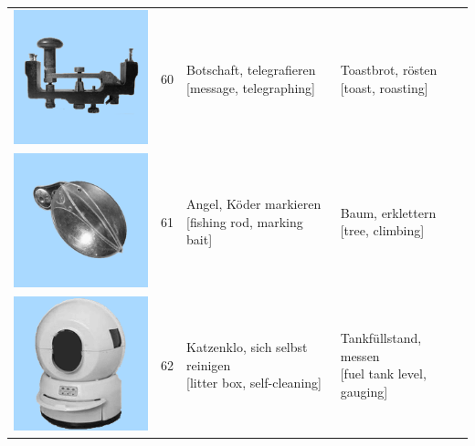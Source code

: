 \documentclass[
  english,
  man,floatsintext]{apa7}
\begin{document}
\begin{center}
\begin{ThreePartTable}
{\begin{longtable}{llll}
\includegraphics[valign=c, scale=0.23]{../materials/unfamiliar/60.png} & 60 & \makecell[l]{Botschaft, telegrafieren\\{[message, telegraphing]}} & \makecell[l]{Toastbrot, rösten\\{[toast, roasting]}}\\
\includegraphics[valign=c, scale=0.23]{../materials/unfamiliar/61.png} & 61 & \makecell[l]{Angel, Köder markieren\\{[fishing rod, marking bait]}} & \makecell[l]{Baum, erklettern\\{[tree, climbing]}}\\
\includegraphics[valign=c, scale=0.23]{../materials/unfamiliar/62.png} & 62 & \makecell[l]{Katzenklo, sich selbst reinigen\\{[litter box, self-cleaning]}} & \makecell[l]{Tankfüllstand, messen\\{[fuel tank level, gauging]}}\\

\end{longtable}}
\end{ThreePartTable}
\end{center}
\end{document}

